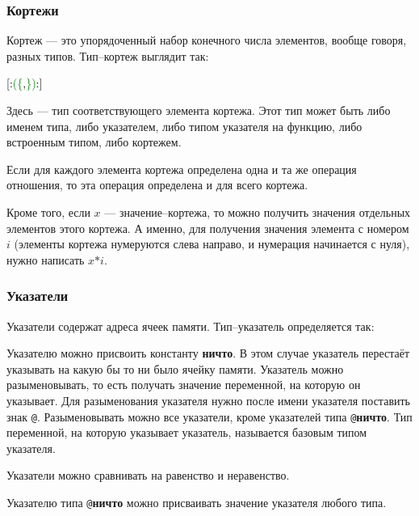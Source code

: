 \documentclass[10pt]{report}
\begin{document}
      

        \subsubsection{Кортежи}
Кортеж --- это упорядоченный набор конечного числа элементов, вообще говоря, разных типов. Тип--кортеж выглядит так:
\begin{center}
\noindent\textcolor{Green}{\textcolor{Black}{[:}(\{\textcolor{Black}{,}\})\textcolor{Black}{:]}}
\end{center} 
   
Здесь \textcolor{Green}{}  --- тип соответствующего элемента кортежа. Этот тип может быть либо именем типа, либо указателем, либо типом указателя на функцию, либо встроенным типом, либо кортежем.

Если для каждого элемента кортежа определена одна и та же операция отношения, то эта операция определена и для всего кортежа.

Кроме того, если $x$ --- значение--кортежа, то можно получить значения отдельных элементов этого кортежа. А именно, для получения значения элемента с номером $i$ (элементы кортежа нумеруются слева направо, и нумерация начинается с нуля), нужно написать $x\texttt{*}i$.

        \subsubsection{Указатели}
Указатели содержат адреса ячеек памяти. Тип--указатель определяется так:
\begin{center}
\noindent\textcolor{Green}{}
\end{center}

Указателю можно присвоить константу \textbf{ничто}. В этом случае указатель перестаёт указывать на какую бы то ни было ячейку памяти. Указатель можно разыменовывать, то есть
получать значение переменной, на которую он указывает. Для разыменования указателя нужно после имени указателя поставить знак \texttt{@}. Разыменовывать можно все указатели,
кроме указателей типа \texttt{@}\textbf{ничто}. Тип переменной, на которую указывает указатель, называется базовым типом указателя.

Указатели можно сравнивать на равенство и неравенство. 

Указателю типа \texttt{@}\textbf{ничто} можно присваивать значение указателя любого типа.
\end{document}
